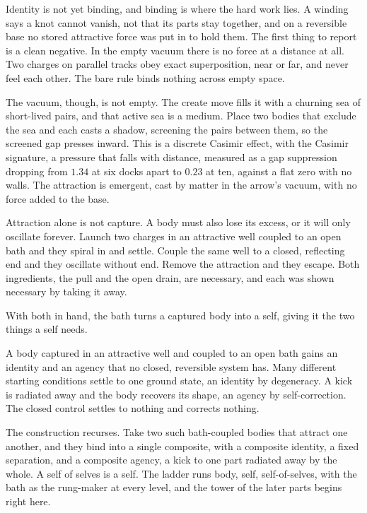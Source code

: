Identity is not yet binding, and binding is where the hard work lies. A winding says a knot cannot vanish, not that its parts stay together, and on a reversible base no stored attractive force was put in to hold them. The first thing to report is a clean negative. In the empty vacuum there is no force at a distance at all. Two charges on parallel tracks obey exact superposition, near or far, and never feel each other. \cite{pollard2026vibetest} The bare rule binds nothing across empty space.

The vacuum, though, is not empty. The create move fills it with a churning sea of short-lived pairs, and that active sea is a medium. Place two bodies that exclude the sea and each casts a shadow, screening the pairs between them, so the screened gap presses inward. This is a discrete Casimir effect, with the Casimir signature, a pressure that falls with distance, measured as a gap suppression dropping from $1.34$ at six docks apart to $0.23$ at ten, against a flat zero with no walls. \cite{pollard2026vibetest} The attraction is emergent, cast by matter in the arrow's vacuum, with no force added to the base.

Attraction alone is not capture. A body must also lose its excess, or it will only oscillate forever. Launch two charges in an attractive well coupled to an open bath and they spiral in and settle. Couple the same well to a closed, reflecting end and they oscillate without end. Remove the attraction and they escape. Both ingredients, the pull and the open drain, are necessary, and each was shown necessary by taking it away. \cite{pollard2026vibetest}

With both in hand, the bath turns a captured body into a self, giving it the two things a self needs.

\begin{result}
A body captured in an attractive well and coupled to an open bath gains an identity and an agency that no closed, reversible system has. Many different starting conditions settle to one ground state, an identity by degeneracy. A kick is radiated away and the body recovers its shape, an agency by self-correction. The closed control settles to nothing and corrects nothing. \cite{pollard2026vibetest}
\end{result}

The construction recurses. Take two such bath-coupled bodies that attract one another, and they bind into a single composite, with a composite identity, a fixed separation, and a composite agency, a kick to one part radiated away by the whole. \cite{pollard2026vibetest} A self of selves is a self. The ladder runs body, self, self-of-selves, with the bath as the rung-maker at every level, and the tower of the later parts begins right here.

